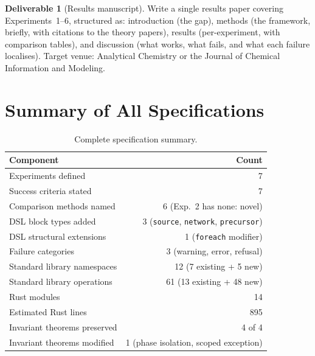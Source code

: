 \documentclass[11pt,a4paper]{article}
\theoremstyle{planstyle}
\theoremstyle{definition}
\newtheorem{deliverable}[theorem]{Deliverable}
\theoremstyle{remark}
\newcommand{\shk}[1]{\texttt{#1}}
\begin{document}
\begin{deliverable}[Results manuscript]
\label{del:manuscript}
Write a single results paper covering Experiments~1--6, structured as:
introduction (the gap), methods (the framework, briefly, with citations
to the theory papers), results (per-experiment, with comparison tables),
and discussion (what works, what fails, and what each failure localises).
Target venue: Analytical Chemistry or the Journal of Chemical Information
and Modeling.
\end{deliverable}

\section*{Summary of All Specifications}

\begin{table}[htbp]
\centering
\small
\caption{Complete specification summary.}
\label{tab:summary}
\begin{tabular}{@{}lr@{}}
\toprule
\textbf{Component} & \textbf{Count} \\
\midrule
Experiments defined & 7 \\
Success criteria stated & 7 \\
Comparison methods named & 6 (Exp.~2 has none: novel) \\
DSL block types added & 3 (\shk{source}, \shk{network}, \shk{precursor}) \\
DSL structural extensions & 1 (\shk{foreach} modifier) \\
Failure categories & 3 (warning, error, refusal) \\
Standard library namespaces & 12 (7 existing + 5 new) \\
Standard library operations & 61 (13 existing + 48 new) \\
Rust modules & 14 \\
Estimated Rust lines & 895 \\
Invariant theorems preserved & 4 of 4 \\
Invariant theorems modified & 1 (phase isolation, scoped exception) \\
\bottomrule
\end{tabular}
\end{table}



\end{document}
